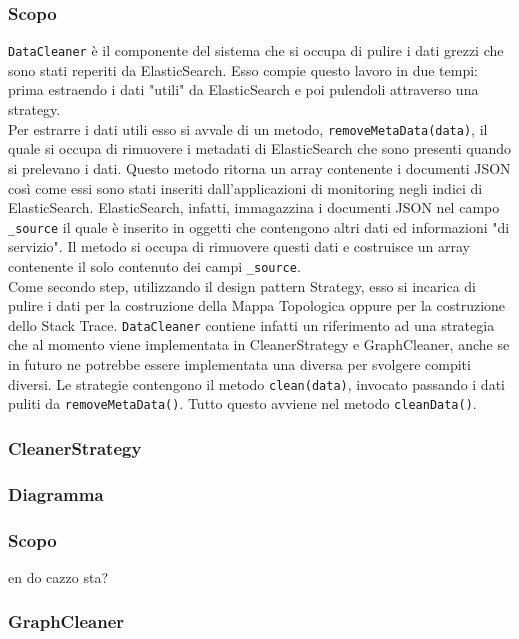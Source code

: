 	\subsubsection{Scopo}
	\texttt{DataCleaner} è il componente del sistema che si occupa di pulire i dati grezzi che sono stati reperiti da ElasticSearch. Esso compie questo lavoro in due tempi: prima estraendo i dati "utili" da ElasticSearch e poi pulendoli attraverso una strategy.\\
	Per estrarre i dati utili esso si avvale di un metodo, \texttt{removeMetaData(data)}, il quale si occupa di rimuovere i metadati di ElasticSearch che sono presenti quando si prelevano i dati. Questo metodo ritorna un array contenente i documenti JSON così come essi sono stati inseriti dall'applicazioni di monitoring negli indici di ElasticSearch. ElasticSearch, infatti, immagazzina i documenti JSON nel campo \texttt{\_source} il quale è inserito in oggetti che contengono altri dati ed informazioni "di servizio". Il metodo si occupa di rimuovere questi dati e costruisce un array contenente il solo contenuto dei campi \texttt{\_source}.\\
	Come secondo step, utilizzando il design pattern Strategy, esso si incarica di pulire i dati per la costruzione della Mappa Topologica oppure per la costruzione dello Stack Trace. \texttt{DataCleaner} contiene infatti un riferimento ad una strategia che al momento viene implementata in CleanerStrategy e GraphCleaner, anche se in futuro ne potrebbe essere implementata una diversa per svolgere compiti diversi. Le strategie contengono il metodo \texttt{clean(data)}, invocato passando i dati puliti da \texttt{removeMetaData()}. Tutto questo avviene nel metodo \texttt{cleanData()}.
	
\subsubsection{CleanerStrategy}
\label{sec:CleanerStrategy}
	\subsubsection{Diagramma}

	\subsubsection{Scopo}
	en do cazzo sta?
	
	
\subsubsection{GraphCleaner}
\label{sec:GraphCleaner}
